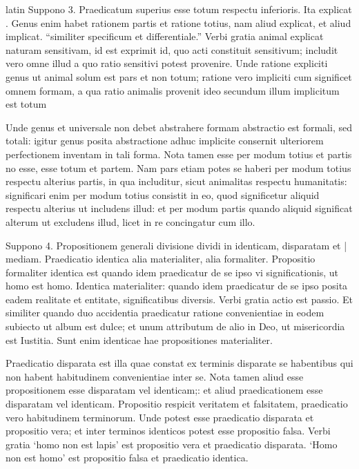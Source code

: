 \begin{otherlanguage*}{latin}
\pstart
Suppono 3. Praedicatum superius esse totum respectu inferioris. Ita explicat . Genus enim habet rationem partis et ratione totius, nam aliud explicat, et aliud implicat. \enquote{similiter specificum et differentiale.} Verbi gratia animal explicat naturam sensitivam, id est exprimit id, quo acti constituit sensitivum; includit vero omne illud a quo ratio sensitivi potest provenire. Unde ratione expliciti genus ut animal solum est pars et non totum; ratione vero impliciti cum significet omnem formam, a qua ratio animalis provenit ideo secundum illum implicitum est totum 
\pend

\pstart
Unde genus et universale non debet abstrahere formam abstractio est formali, sed totali:
igitur genus posita abstractione adhuc implicite consernit ulteriorem perfectionem inventam in tali forma. Nota tamen esse per modum totius et partis no esse, esse totum et partem. Nam pars etiam potes se haberi per modum totius respectu alterius partis, in qua includitur, sicut animalitas respectu humanitatis:
significari enim per modum totius consistit in eo, quod significetur aliquid respectu alterius ut includens illud:
et per modum partis quando aliquid significat alterum ut excludens illud, licet in re concingatur cum illo. 
\pend

\pstart
Suppono 4. Propositionem generali divisione dividi in identicam, disparatam et \textnormal{|} mediam. Praedicatio identica alia materialiter, alia formaliter. Propositio formaliter identica est quando idem praedicatur de se ipso vi significationis, ut homo est homo. Identica materialiter:
quando idem praedicatur de se ipso posita eadem realitate et entitate, significatibus diversis. Verbi gratia actio est passio. Et similiter quando duo accidentia praedicatur ratione convenientiae in eodem subiecto ut album est dulce; et unum attributum de alio in Deo, ut misericordia est Iustitia. Sunt enim identicae hae propositiones materialiter. 
\pend

\pstart
Praedicatio disparata est illa quae constat ex terminis disparate se habentibus qui non habent habitudinem convenientiae inter se. Nota tamen aliud esse propositionem esse disparatam vel identicam;:
et aliud praedicationem esse disparatam vel identicam. Propositio respicit veritatem et falsitatem, praedicatio vero habitudinem terminorum. Unde potest esse praedicatio disparata et propositio vera; et inter terminos identicos potest esse propositio falsa. Verbi gratia `homo non est lapis' est propositio vera et praedicatio disparata. `Homo non est homo' est propositio falsa et praedicatio identica. 
\pend


\end{otherlanguage*}
